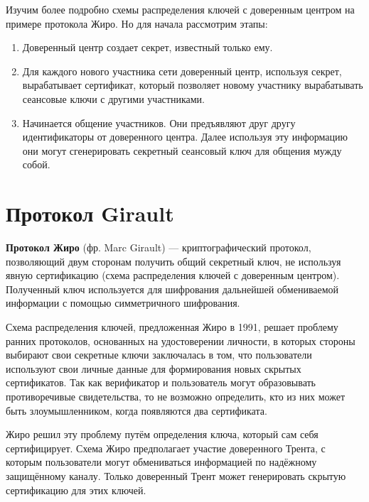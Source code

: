 \documentclass[a4paper]{article}
\begin{document}
Изучим более подробно схемы распределения ключей с доверенным центром на примере протокола Жиро. 
Но для начала рассмотрим этапы:
\begin{enumerate}
    \item Доверенный центр создает секрет, известный только ему.
    \item Для каждого нового участника сети доверенный центр, используя секрет, вырабатывает сертификат, который позволяет новому участнику 
    вырабатывать сеансовые ключи с другими участниками.
    \item Начинается общение участников. Они предъявляют друг другу идентификаторы от доверенного центра. Далее используя эту информацию они могут сгенерировать секретный сеансовый ключ для общения мужду собой.
\end{enumerate}

\section*{Протокол Girault}

\textbf{Протокол Жиро} (фр. Marc Girault) — криптографический протокол, позволяющий двум сторонам получить общий секретный ключ, не используя явную сертификацию (схема распределения ключей с доверенным центром). 
Полученный ключ используется для шифрования дальнейшей обмениваемой информации с помощью симметричного шифрования.

Схема распределения ключей, предложенная Жиро в 1991, решает проблему ранних протоколов, основанных на удостоверении личности,
 в которых стороны выбирают свои секретные ключи заключалась в том, что пользователи используют свои личные данные
  для формирования новых скрытых сертификатов. Так как верификатор и пользователь могут образовывать противоречивые 
  свидетельства, то не возможно определить, кто из них может быть злоумышленником, когда появляются два сертификата.

Жиро решил эту проблему путём определения ключа, который сам себя сертифицирует. 
Схема Жиро предполагает участие доверенного Трента, с которым пользователи могут обмениваться информацией 
по надёжному защищённому каналу. Только доверенный Трент может генерировать скрытую сертификацию для этих ключей.
\end{document}
